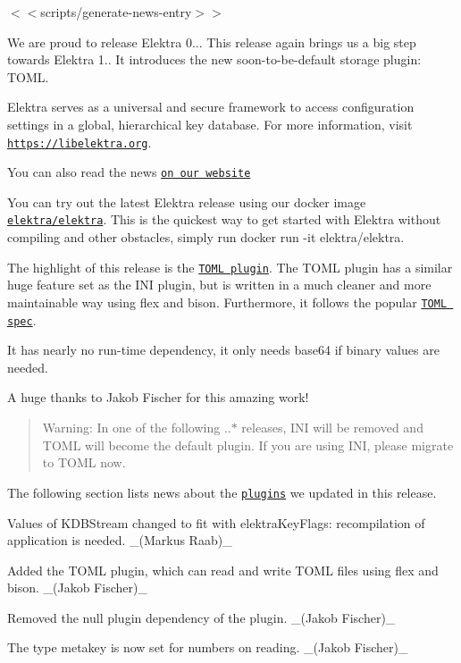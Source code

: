 $<$$<${\ttfamily scripts/generate-\/news-\/entry}$>$$>$

We are proud to release Elektra 0... This release again brings us a big step towards Elektra 1.. It introduces the new soon-\/to-\/be-\/default storage plugin\+: T\+O\+ML.

Elektra serves as a universal and secure framework to access configuration settings in a global, hierarchical key database. For more information, visit \href{https://libelektra.org}{\tt https\+://libelektra.\+org}.

You can also read the news \href{https://www.libelektra.org/news/0.9.3-release}{\tt on our website}

You can try out the latest Elektra release using our docker image \href{https://hub.docker.com/r/elektra/elektra}{\tt elektra/elektra}. This is the quickest way to get started with Elektra without compiling and other obstacles, simply run {\ttfamily docker run -\/it elektra/elektra}.

The highlight of this release is the \href{https://www.libelektra.org/plugins/toml}{\tt T\+O\+ML plugin}. The T\+O\+ML plugin has a similar huge feature set as the I\+NI plugin, but is written in a much cleaner and more maintainable way using flex and bison. Furthermore, it follows the popular \href{https://toml.io}{\tt T\+O\+ML spec}.

It has nearly no run-\/time dependency, it only needs {\ttfamily base64} if binary values are needed.

A huge thanks to Jakob Fischer for this amazing work!

\begin{quote}
Warning\+: In one of the following {..$\ast$} releases, I\+NI will be removed and T\+O\+ML will become the default plugin. If you are using I\+NI, please migrate to T\+O\+ML now. \end{quote}


The following section lists news about the \href{https://www.libelektra.org/plugins/readme}{\tt plugins} we updated in this release.


\begin{DoxyItemize}
\item Values of K\+D\+B\+Stream changed to fit with elektra\+Key\+Flags\+: recompilation of application is needed. \+\_\+(\+Markus Raab)\+\_\+
\end{DoxyItemize}


\begin{DoxyItemize}
\item Added the T\+O\+ML plugin, which can read and write T\+O\+ML files using flex and bison. \+\_\+(\+Jakob Fischer)\+\_\+
\item Removed the {\ttfamily null} plugin dependency of the plugin. \+\_\+(\+Jakob Fischer)\+\_\+
\item The {\ttfamily type} metakey is now set for numbers on reading. \+\_\+(\+Jakob Fischer)\+\_\+
\end{DoxyItemize}


